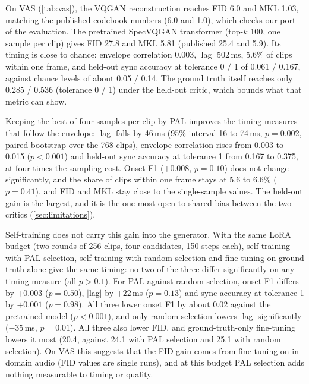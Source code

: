 

On VAS (\cref{tab:vas}), the VQGAN reconstruction reaches FID 6.0 and MKL 1.03, matching the published codebook numbers (6.0 and 1.0), which checks our port of the evaluation. The pretrained SpecVQGAN transformer (top-$k$ 100, one sample per clip) gives FID 27.8 and MKL 5.81 (published 25.4 and 5.9). Its timing is close to chance: envelope correlation 0.003, $|$lag$|$ 502\,ms, 5.6\% of clips within one frame, and held-out sync accuracy at tolerance 0 / 1 of 0.061 / 0.167, against chance levels of about 0.05 / 0.14. The ground truth itself reaches only 0.285 / 0.536 (tolerance 0 / 1) under the held-out critic, which bounds what that metric can show. 

Keeping the best of four samples per clip by PAL improves the timing measures that follow the envelope: $|$lag$|$ falls by 46\,ms (95\% interval 16 to 74\,ms, $p = 0.002$, paired bootstrap over the 768 clips), envelope correlation rises from 0.003 to 0.015 ($p < 0.001$) and held-out sync accuracy at tolerance 1 from 0.167 to 0.375, at four times the sampling cost. Onset F1 ($+0.008$, $p = 0.10$) does not change significantly, and the share of clips within one frame stays at 5.6 to 6.6\% ($p = 0.41$), and FID and MKL stay close to the single-sample values. The held-out gain is the largest, and it is the one most open to shared bias between the two critics (\cref{sec:limitations}).

Self-training does not carry this gain into the generator. With the same LoRA budget (two rounds of 256 clips, four candidates, 150 steps each), self-training with PAL selection, self-training with random selection and fine-tuning on ground truth alone give the same timing: no two of the three differ significantly on any timing measure (all $p > 0.1$). For PAL against random selection, onset F1 differs by $+0.003$ ($p = 0.50$), $|$lag$|$ by $+22$\,ms ($p = 0.13$) and sync accuracy at tolerance 1 by $+0.001$ ($p = 0.98$). All three lower onset F1 by about 0.02 against the pretrained model ($p < 0.001$), and only random selection lowers $|$lag$|$ significantly ($-35$\,ms, $p = 0.01$). All three also lower FID, and ground-truth-only fine-tuning lowers it most (20.4, against 24.1 with PAL selection and 25.1 with random selection). On VAS this suggests that the FID gain comes from fine-tuning on in-domain audio (FID values are single runs), and at this budget PAL selection adds nothing measurable to timing or quality.



